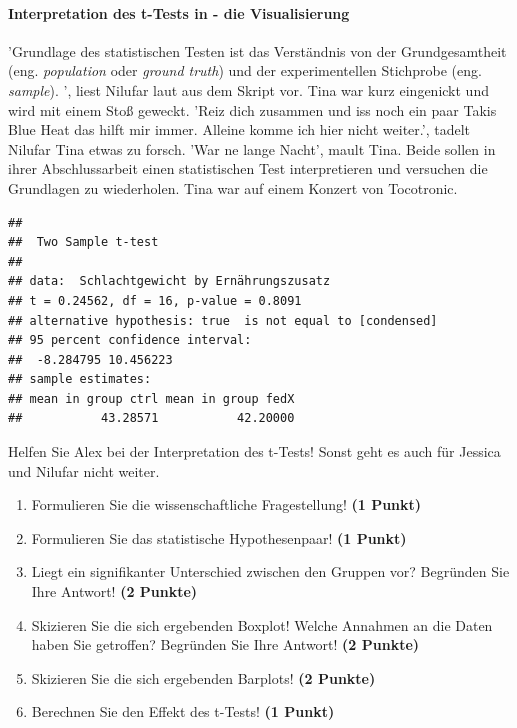 \documentclass[a4paper, 9pt]{scrartcl}\usepackage[]{graphicx}\usepackage[]{xcolor}
\makeatletter
\newenvironment{kframe}{%
 \def\at@end@of@kframe{}%
 \ifinner\ifhmode%
  \def\at@end@of@kframe{\end{minipage}}%
  \begin{minipage}{\columnwidth}%
 \fi\fi%
 \def\FrameCommand##1{\hskip\@totalleftmargin \hskip-\fboxsep
 \colorbox{shadecolor}{##1}\hskip-\fboxsep
     \hskip-\linewidth \hskip-\@totalleftmargin \hskip\columnwidth}%
 \MakeFramed {\advance\hsize-\width
   \@totalleftmargin\z@ \linewidth\hsize
   \@setminipage}}%
 {\par\unskip\endMakeFramed%
 \at@end@of@kframe}
\newenvironment{knitrout}{}{} %
\makeatother
\begin{document}
\begin{knitrout}
\color{fgcolor}\begin{kframe}


{\ttfamily\noindent\bfseries\color{errorcolor}{\#\# Error in eval(expr, envir, enclos): object 'attr\_name\_sec\_vec' not found}}\end{kframe}
\end{knitrout}

\paragraph{Interpretation des t-Tests in \Rlogo - die Visualisierung}

'Grundlage des statistischen Testen ist das Verständnis von der Grundgesamtheit (eng. \textit{population} oder \textit{ground truth}) und der experimentellen Stichprobe (eng. \textit{sample}). ', liest Nilufar laut aus dem Skript vor. Tina war kurz eingenickt und wird mit einem Stoß geweckt. 'Reiz dich zusammen und iss noch ein paar Takis Blue Heat das hilft mir immer. Alleine komme ich hier nicht weiter.', tadelt Nilufar Tina etwas zu forsch. 'War ne lange Nacht', mault Tina. Beide sollen in ihrer Abschlussarbeit einen statistischen Test interpretieren und versuchen die Grundlagen zu wiederholen. Tina war auf einem Konzert von Tocotronic.

\begin{knitrout}
\color{fgcolor}\begin{kframe}
\begin{verbatim}
## 
## 	Two Sample t-test
## 
## data:  Schlachtgewicht by Ernährungszusatz
## t = 0.24562, df = 16, p-value = 0.8091
## alternative hypothesis: true  is not equal to [condensed]
## 95 percent confidence interval:
##  -8.284795 10.456223
## sample estimates:
## mean in group ctrl mean in group fedX 
##           43.28571           42.20000
\end{verbatim}
\end{kframe}
\end{knitrout}

Helfen Sie Alex bei der Interpretation des t-Tests! Sonst geht es auch für Jessica und Nilufar nicht weiter.
  
\begin{enumerate}
  \item Formulieren Sie die wissenschaftliche Fragestellung! \textbf{(1 Punkt)}
  \item Formulieren Sie das statistische Hypothesenpaar! \textbf{(1 Punkt)}
\item Liegt ein signifikanter Unterschied zwischen den Gruppen vor? Begründen Sie Ihre Antwort! \textbf{(2 Punkte)}
\item Skizieren Sie die sich ergebenden Boxplot! Welche Annahmen an die Daten haben Sie getroffen? Begründen Sie Ihre
  Antwort! \textbf{(2 Punkte)} 
\item Skizieren Sie die sich ergebenden Barplots! \textbf{(2 Punkte)}
\item Berechnen Sie den Effekt des t-Tests! \textbf{(1 Punkt)}
\end{enumerate}
 
\end{document}
